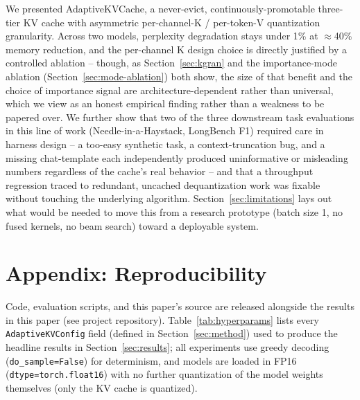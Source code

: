 \documentclass[conference]{IEEEtran}
\begin{document}
We presented AdaptiveKVCache, a never-evict, continuously-promotable three-tier KV cache
with asymmetric per-channel-K / per-token-V quantization granularity. Across two models,
perplexity degradation stays under 1\% at $\approx$40\% memory reduction, and the
per-channel K design choice is directly justified by a controlled ablation -- though, as
Section~\ref{sec:kgran} and the importance-mode ablation (Section~\ref{sec:mode-ablation})
both show, the size of that benefit and the choice of importance signal are
architecture-dependent rather than universal, which we view as an honest empirical
finding rather than a weakness to be papered over. We further show that two of the three
downstream task evaluations in this line of work (Needle-in-a-Haystack, LongBench F1)
required care in harness design -- a too-easy synthetic task, a context-truncation bug,
and a missing chat-template each independently produced uninformative or misleading
numbers regardless of the cache's real behavior -- and that a throughput regression
traced to redundant, uncached dequantization work was fixable without touching the
underlying algorithm. Section~\ref{sec:limitations} lays out what would be needed to move
this from a research prototype (batch size 1, no fused kernels, no beam search) toward a
deployable system.

\appendix
\section*{Appendix: Reproducibility}

Code, evaluation scripts, and this paper's source are released alongside the results in
this paper (see project repository). Table~\ref{tab:hyperparams} lists every
\texttt{AdaptiveKVConfig} field (defined in Section~\ref{sec:method}) used to produce
the headline results in Section~\ref{sec:results}; all experiments use greedy decoding
(\texttt{do\_sample=False}) for determinism, and models are loaded in FP16
(\texttt{dtype=torch.float16}) with no further quantization of the model weights
themselves (only the KV cache is quantized).
\end{document}
